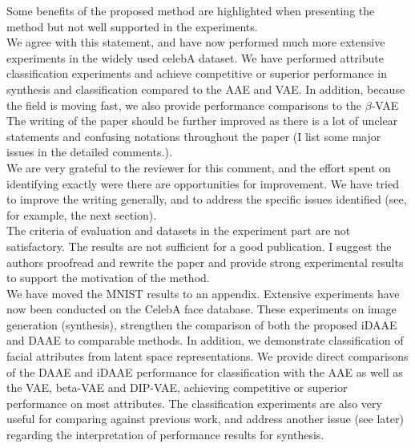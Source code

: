\documentclass[a4paper,11pt]{article}
\begin{document}
{\color{blue} Some benefits of the proposed method are highlighted when presenting the method but not well supported in the experiments. }\\

We agree with this statement, and have now performed much more extensive experiments in the widely used celebA dataset. We have performed attribute classification experiments and achieve competitive or superior performance in synthesis and classification compared to the AAE and VAE. In addition, because the field is moving fast, we also provide performance comparisons to the $\beta$-VAE\\


{\color{blue} The writing of the paper should be further improved as there is a lot of unclear statements and confusing notations throughout the paper (I list some major issues in the detailed comments.).} \\

We are very grateful to the reviewer for this comment, and the effort spent on identifying exactly were there are opportunities for improvement. We have tried to improve the writing generally, and to address the specific issues identified (see, for example, the next section). \\

{\color{blue} The criteria of evaluation and datasets in the experiment part are not satisfactory. The results are not sufficient for a good publication. I suggest the authors proofread and rewrite the paper and provide strong experimental results to support the motivation of the method.}\\

We have moved the MNIST results to an appendix. Extensive experiments have now been conducted on the CelebA face database. These experiments on image generation (synthesis), strengthen the comparison of both the proposed iDAAE and DAAE to comparable methods. In addition, we demonstrate classification of facial attributes from latent space representations. We provide direct comparisons of the DAAE and iDAAE performance for classification with the AAE as well as the VAE, beta-VAE and DIP-VAE, achieving competitive or superior performance on most attributes. The classification experiments are also very useful for comparing against previous work, and address another issue (see later) regarding the interpretation of performance results for synthesis.\\
\end{document}
